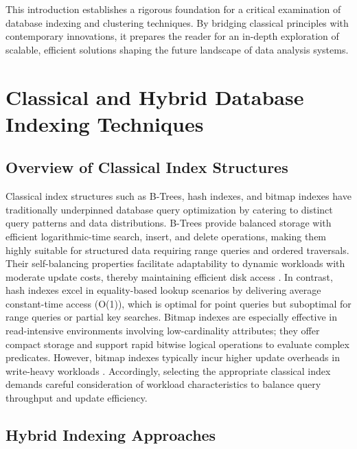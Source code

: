 \documentclass[sigconf]{acmart}
\begin{document}
This introduction establishes a rigorous foundation for a critical examination of database indexing and clustering techniques. By bridging classical principles with contemporary innovations, it prepares the reader for an in-depth exploration of scalable, efficient solutions shaping the future landscape of data analysis systems.

\section{Classical and Hybrid Database Indexing Techniques}

\subsection{Overview of Classical Index Structures}

Classical index structures such as B-Trees, hash indexes, and bitmap indexes have traditionally underpinned database query optimization by catering to distinct query patterns and data distributions. B-Trees provide balanced storage with efficient logarithmic-time search, insert, and delete operations, making them highly suitable for structured data requiring range queries and ordered traversals. Their self-balancing properties facilitate adaptability to dynamic workloads with moderate update costs, thereby maintaining efficient disk access \cite{ref31}. In contrast, hash indexes excel in equality-based lookup scenarios by delivering average constant-time access (O(1)), which is optimal for point queries but suboptimal for range queries or partial key searches. Bitmap indexes are especially effective in read-intensive environments involving low-cardinality attributes; they offer compact storage and support rapid bitwise logical operations to evaluate complex predicates. However, bitmap indexes typically incur higher update overheads in write-heavy workloads \cite{ref31}. Accordingly, selecting the appropriate classical index demands careful consideration of workload characteristics to balance query throughput and update efficiency.

\subsection{Hybrid Indexing Approaches}
\end{document}
